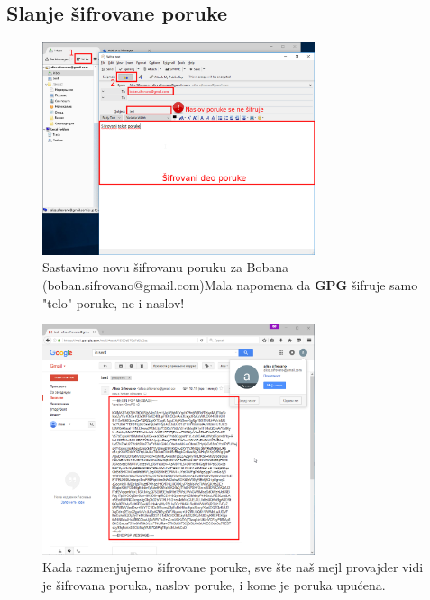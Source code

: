 \documentclass[a4paper,11pt]{article}
\begin{document}
\subsection{Slanje \v{s}ifrovane poruke}
\begin{figure}[!h]
	\begin{center}
		\includegraphics[width=8cm]{52_write_encrypted_message.png}
		\caption{Sastavimo novu \v{s}ifrovanu poruku za Bobana (boban.sifrovano@gmail.com)\newline Mala napomena da \textbf{GPG} \v{s}ifruje samo "telo" poruke, ne i naslov!}
		\label{compose_message}
	\end{center}
\end{figure}
\begin{figure}[!h]
	\begin{center}
		\includegraphics[width=8cm]{53_encrypted_message_google.png}
		\caption{Kada razmenjujemo \v{s}ifrovane poruke, sve \v{s}te na\v{s} mejl provajder vidi je \v{s}ifrovana poruka, naslov poruke, i kome je poruka upu\'{c}ena. \newline\newline\newline}
		\label{Email_provider_sees_encrypted_message}
	\end{center}
\end{figure}
\newpage
\end{document}
